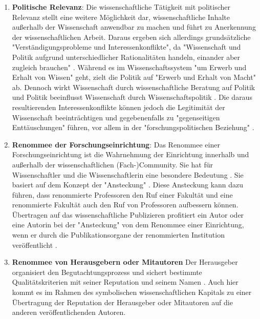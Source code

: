 \begin{enumerate}
\item \textbf{Politische Relevanz}: Die wissenschaftliche Tätigkeit mit politischer Relevanz stellt eine weitere Möglichkeit dar, wissenschaftliche Inhalte außerhalb der Wissenschaft anwendbar zu machen und führt zu Anerkennung der wissenschaftlichen Arbeit. Daraus ergeben sich allerdings grundsätzliche "Verständigungsprobleme und Interessenkonflikte", da  "Wissenschaft und Politik aufgrund unterschiedlicher Rationalitäten handeln, einander aber zugleich brauchen" \cite{Mayntz_1996}. Während es im Wissenschaftssystem "um Erwerb und Erhalt von Wissen" geht, zielt die Politik auf "Erwerb und Erhalt von Macht" \cite{Mayntz_1996} ab. Dennoch wirkt Wissenschaft durch wissenschaftliche Beratung auf Politik und  Politik beeinflusst Wissenschaft durch Wissenschaftspolitik \cite[:10]{Brown_2014}. Die daraus resultierenden Interessenkonflikte können jedoch die Legitimität der Wissenschaft beeinträchtigen \cite{Weingart_2005} \cite[:494]{Weber_1992} und gegebenenfalls zu "gegenseitigen Enttäuschungen" führen, vor allem in der "forschungspolitischen Beziehung" \cite{Mayntz_1996}.
\item \textbf{Renommee der Forschungseinrichtung}: Das Renommee einer Forschungseinrichtung ist die Wahrnehmung der Einrichtung innerhalb und außerhalb der wissenschaftlichen (Fach-)Community. Sie hat für Wissenschaftler und die Wissenschaftlerin eine besondere Bedeutung \cite{Mayntz_2008}. Sie basiert auf dem Konzept der "Ansteckung" \cite{Luhmann_1970}. Diese Ansteckung kann dazu führen, dass renommierte Professoren den Ruf einer Fakultät und eine renommierte Fakultät auch den Ruf von Professoren aufbessern können. Übertragen auf das wissenschaftliche Publizieren profitiert ein Autor oder eine Autorin bei der "Ansteckung" von dem Renommee einer Einrichtung, wenn er durch die Publikationsorgane der renommierten Institution veröffentlicht \cite{Lutz_2012} \cite{Buss_2001}.
\item \textbf{Renommee von Herausgebern oder Mitautoren} Der Herausgeber organisiert den Begutachtungsprozess und sichert bestimmte Qualitätskriterien mit seiner Reputation und seinem Namen \cite{Mueller_2009}. Auch hier kommt es im Rahmen des symbolischen wissenschaftlichen Kapitals zu einer Übertragung der Reputation der Herausgeber oder Mitautoren auf die anderen veröffentlichenden Autoren.

\end{enumerate}
